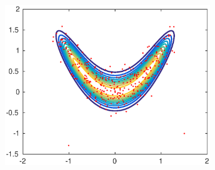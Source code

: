 \begin{figure}[t]
\begin{subfigure}{0.32\linewidth}
		\includegraphics[width=1\linewidth]{plots/MHvsRAM/MH_big}
	\end{subfigure}
	

\end{figure}
